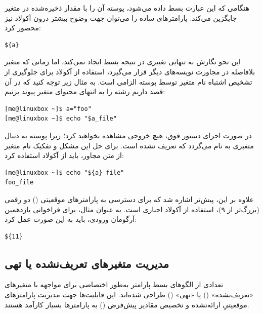 هنگامی که این عبارت بسط داده می‌شود، پوسته آن را با مقدار ذخیره‌شده در متغیر  جایگزین می‌کند. پارامترهای ساده را می‌توان جهت وضوح بیشتر درون آکولاد نیز محصور کرد:

\begin{latin}
\begin{lstlisting}
${a}
\end{lstlisting}
\end{latin}

این نحو نگارش به تنهایی تغییری در نتیجه بسط ایجاد نمی‌کند، اما زمانی که متغیر بلافاصله در مجاورت نویسه‌های دیگر قرار می‌گیرد، استفاده از آکولاد برای جلوگیری از تشخیص اشتباه نام متغیر توسط پوسته الزامی است. به مثال زیر توجه کنید که در آن قصد داریم رشته \file{\_} را به انتهای محتوای متغیر  پیوند بزنیم:

\begin{latin}
\begin{lstlisting}
[me@linuxbox ~]$ a="foo"
[me@linuxbox ~]$ echo "$a_file"

\end{lstlisting}
\end{latin}

در صورت اجرای دستور فوق، هیچ خروجی مشاهده نخواهید کرد؛ زیرا پوسته به دنبال متغیری به نام  می‌گردد که تعریف نشده است. برای حل این مشکل و تفکیک نام متغیر از متن مجاور، باید از آکولاد استفاده کرد:

\begin{latin}
\begin{lstlisting}
[me@linuxbox ~]$ echo "${a}_file"
foo_file
\end{lstlisting}
\end{latin}

علاوه بر این، پیش‌تر اشاره شد که برای دسترسی به پارامترهای موقعیتی () دو رقمی (بزرگ‌تر از ۹)، استفاده از آکولاد اجباری است. به عنوان مثال، برای فراخوانی یازدهمین آرگومان ورودی، باید به این صورت عمل کرد:

\begin{latin}
\begin{lstlisting}
${11}
\end{lstlisting}
\end{latin}

\subsection{مدیریت متغیرهای تعریف‌نشده یا تهی}

تعدادی از الگوهای بسط پارامتر به‌طور اختصاصی برای مواجهه با متغیرهای «تعریف‌نشده» () یا «تهی» () طراحی شده‌اند. این قابلیت‌ها جهت مدیریت پارامترهای موقعیتیِ ارائه‌نشده و تخصیص مقادیر پیش‌فرض () به پارامترها بسیار کارآمد هستند.

